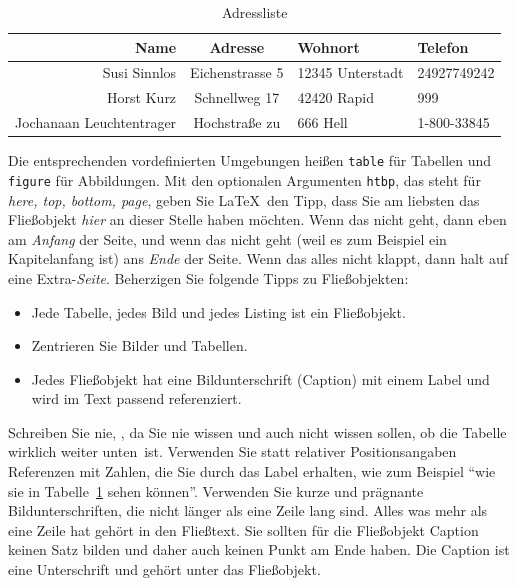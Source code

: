 \documentclass[11pt,a4paper]{report}
\begin{document}

\begin{table}[htbp] %
\centering
\begin{tabular}{|r|c|l|l|}
\hline
\textbf{Name} & \textbf{Adresse} & \textbf{Wohnort} & \textbf{Telefon} \\ 
\hline\hline
Susi Sinnlos & Eichenstrasse 5 & 12345 Unterstadt & 24927749242 \\
Horst Kurz & Schnellweg 17 & 42420 Rapid & 999 \\\hline
Jochanaan Leuchtentrager & Hochstraße zu & 666 Hell & 1-800-33845\\\hline
\end{tabular}
\caption{Adressliste}
\label{tab:meinetab}
\end{table}

Die entsprechenden vordefinierten Umgebungen heißen 
\verb|table| für Tabellen und \verb|figure| für Abbildungen. 
Mit den optionalen Argumenten \verb|htbp|, das steht für
\textit{here, top, bottom, page}, geben Sie \LaTeX\ den 
Tipp, dass Sie am liebsten das Fließobjekt \textit{hier}
an dieser Stelle haben möchten. Wenn das nicht geht, dann
eben am \textit{Anfang} der Seite, und wenn das nicht geht (weil es
zum Beispiel ein Kapitelanfang ist) ans \textit{Ende} der Seite. 
Wenn das alles nicht klappt, dann halt auf eine Extra-\textit{Seite}.
Beherzigen Sie folgende Tipps zu Fließobjekten:
\begin{itemize}
\item Jede Tabelle, jedes Bild und jedes Listing ist ein Fließobjekt.
\item Zentrieren Sie Bilder und Tabellen.
\item Jedes Fließobjekt hat eine Bildunterschrift (Caption) mit
  einem Label und wird im Text passend referenziert.
\end{itemize}
Schreiben Sie nie, ,
da Sie nie wissen und auch nicht wissen sollen, ob die Tabelle 
wirklich \glqq weiter unten\grqq\ ist. 
Verwenden Sie statt relativer Positionsangaben Referenzen mit Zahlen,
die Sie durch das Label erhalten, wie zum Beispiel 
"`wie sie in Tabelle~\ref{tab:meinetab} sehen können"'.
Verwenden Sie kurze und prägnante Bildunterschriften, die 
nicht länger als eine Zeile lang sind. 
Alles was mehr als eine Zeile hat gehört in den Fließtext.
Sie sollten für die Fließobjekt Caption keinen Satz bilden und 
daher auch keinen Punkt am Ende haben.
Die Caption ist eine Unterschrift und gehört unter das Fließobjekt.
\end{document}
